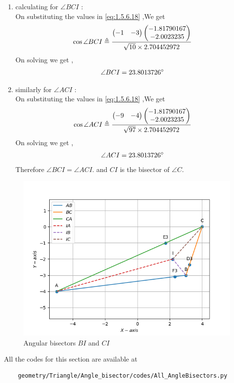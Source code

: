 \documentclass[10pt]{book}
\begin{document}
\begin{enumerate}[label=\thesection.\arabic*.,ref=\thesection.\theenumi]
\begin{enumerate}
\begin{enumerate}[label=(\alph*)]
    \item calculating for $\angle BCI$ : \\
    On substituting the values in  \eqref{eq:1.5.6.18} ,We get 
    \begin{align}
        \cos{\angle BCI} \triangleq \frac{\begin{pmatrix} -1 & -3\end{pmatrix}\begin{pmatrix}-1.81790167 \\ -2.0023235\end{pmatrix}}{ \sqrt{10} \times 2.704452972 } \\
    \end{align}
    On solving we get ,
    \begin{align}
        \angle BCI = 23.8013726 \degree
    \end{align}
       \item similarly for $\angle ACI$ : \\
    On substituting the values in  \eqref{eq:1.5.6.18} ,We get 
    \begin{align}
        \cos{\angle ACI} \triangleq \frac{\begin{pmatrix} -9 & -4\end{pmatrix}\begin{pmatrix}-1.81790167 \\ -2.0023235\end{pmatrix}}{ \sqrt{97} \times 2.704452972} \\
    \end{align}
    On solving we get ,
    \begin{align}
        \angle ACI = 23.8013726\degree
    \end{align}
    Therefore $\angle BCI = \angle ACI.$ and $CI$ is the bisector of $\angle C$. 
\end{enumerate}
\begin{figure}[H]
    \centering
     \includegraphics{figs/BICI_bisectors.png}
    \caption{Angular bisectors  $BI$ and $CI$}
    \label{fig:Ang_bisect5}
\end{figure}
\end{enumerate}
All the codes for this section are available at
\begin{lstlisting}
	geometry/Triangle/Angle_bisector/codes/All_AngleBisectors.py
\end{lstlisting}
\end{enumerate}
\end{document}
